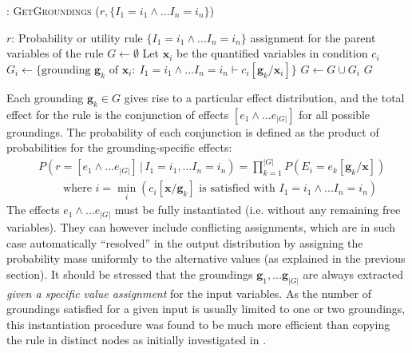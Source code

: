  
\begin{algorithm}[h!]
\caption{: \textsc{GetGroundings} ($r, \{I_1\!=\!i_1 \land ... I_n\!=\!i_n\}$)}
\begin{algorithmic}[1] \vspace{1mm}
\REQUIRE $r$: Probability or utility rule 
\REQUIRE $\{I_1\!=\!i_1 \land ... I_n\!=\!i_n\}$ assignment for the parent variables of the rule  \vspace{1mm}
\STATE $G \leftarrow \emptyset$
\STATE Let $\mathbf{x}_i$ be the quantified variables in condition $c_i$
\STATE $G_i \leftarrow \{\text{grounding } \mathbf{g}_k \text{ of } \mathbf{x}_i: \ I_1\!=\!i_1 \land ... I_n\!=\!i_n \vdash c_i [\mathbf{g}_k / \mathbf{x}_i ]\}$
\STATE $G \leftarrow G \cup G_i$
\ENDFOR
\RETURN $G$
\end{algorithmic}
\label{algo:getgroundings}
\end{algorithm}
 
 Each grounding $\mathbf{g}_k \in G$ gives rise to a particular effect distribution, and the total effect for the rule is the conjunction of effects $[e_1 \land ... e_{|G|}]$ for all possible groundings.  The probability of each conjunction is defined as the product of probabilities for the grounding-specific effects:
\begin{align}
& P(r\!=\![e_1 \land ... e_{|G|}] \, | \, I_1\!=\!i_1,... I_n\!=\!i_n) = \prod_{k=1}^{|G|} P(E_i = e_k[\mathbf{g}_k / \mathbf{x}]) \label{eq:quantifruledistrib}
 \\
& \; \; \; \; \; \; \; \; \text{where } i = \min_i (c_i[\mathbf{x} / \mathbf{g}_k]\text{ is satisfied with } I_1\!=\!i_1 \land ... I_n\!=\!i_n) \nonumber
\end{align}
The effects $e_1 \land ... e_{|G|}$ must be fully instantiated (i.e. without any remaining free variables).  They can however include conflicting assignments, which are in such case automatically ``resolved'' in the output distribution by assigning the probability mass uniformly to the alternative values (as explained in the previous section). It should be stressed that the groundings $\mathbf{g}_1,...\mathbf{g}_{|G|}$ are always extracted \textit{given a specific value assignment} for the input variables.  As the number of groundings satisfied for a given input is usually limited to one or two groundings, this instantiation procedure was found to be much more efficient than copying the rule in distinct nodes as initially investigated in \cite{relational-apl2012}.  

